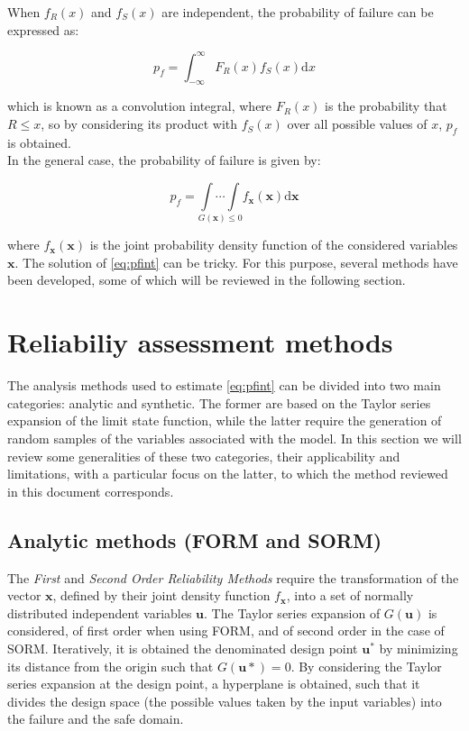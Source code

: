 When $f_R(x)$ and $f_S(x)$ are independent, the probability of failure can be expressed as:

\begin{equation}
    p_f = \int_{-\infty}^{\infty} F_R(x)f_S(x)\mathrm{d}x
\end{equation}

which is known as a convolution integral, where $F_R(x)$ is the probability that $R \leq x$, so by considering its product with $f_S(x)$ over all possible values of $x$, $p_f$ is obtained. \\

In the general case, the probability of failure is given by:

\begin{equation} \label{eq:pfint}
    p_f = \underset{G(\bm{x})\leq 0}{\int \cdots \int}f_{\bm{x}}(\bm{x})\mathrm{d}\bm{x}
\end{equation}

where $f_{\bm{x}}(\bm{x})$ is the joint probability density function of the considered variables $\bm{x}$. The solution of \ref{eq:pfint} can be tricky. For this purpose, several methods have been developed, some of which will be reviewed in the following section.

\section{Reliabiliy assessment methods}

The analysis methods used to estimate \ref{eq:pfint} can be divided into two main categories: analytic and synthetic. The former are based on the Taylor series expansion of the limit state function, while the latter require the generation of random samples of the variables associated with the model. In this section we will review some generalities of these two categories, their applicability and limitations, with a particular focus on the latter, to which the method reviewed in this document corresponds.

\subsection{Analytic methods (FORM and SORM)}
The \textit{First} and \textit{Second Order Reliability Methods} require the transformation of the vector $\bm{x}$, defined by their joint density function $f_{\bm{x}}$, into a set of normally distributed independent variables $\bm{u}$. The Taylor series expansion of $G(\bm{u})$ is considered, of first order when using FORM, and of second order in the case of SORM. Iteratively, it is obtained the denominated design point $\bm{u^*}$ by minimizing its distance from the origin such that $G(\bm{u*})=0$. By considering the Taylor series expansion at the design point, a hyperplane is obtained, such that it divides the design space (the possible values taken by the input variables) into the failure and the safe domain. \\

